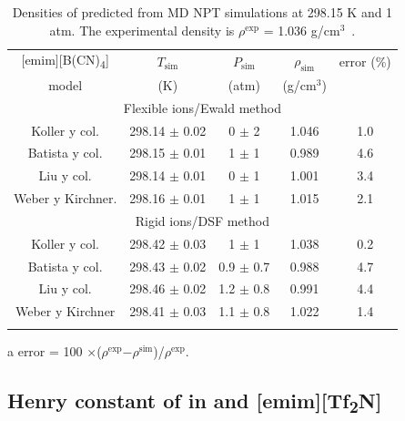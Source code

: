 \documentclass[3p,twocolumn]{elsarticle}
\begin{document}
\begin{table}
\begin{threeparttable}
\caption{Densities of \ce{[emim][B(CN)_4]} predicted from MD NPT simulations at 298.15 K and 1 atm. The experimental density is $\rho^{\text{exp}}$ = 1.036 g/cm$^{3}$~\cite{Doma_ska_2011}.}
\begin{tabular}{ c  c  c  c  c}  
\hline \hline
$\text{[emim]}$[B(CN)\textsubscript{4}] & $T_{\text{sim}}$ & $ P_{\text{sim}} $ & $\rho_{\text{sim}}$ & error (\%)\tnote{a} \\
model & (K) &  (atm) &  (g/cm$^{3}$) &  \\
			\hline
		 \multicolumn{5}{c}{Flexible ions/Ewald method}\\

Koller y col. \cite{Koller_2012}  & 298.14 $\pm$  0.02 & 0 $\pm$ 2 & 1.046 & 1.0 \\
Batista y col. \cite{Batista_2015} & 298.15 $\pm$ 0.01  & 1 $\pm$ 1 & 0.989 & 4.6  \\
Liu y col. \cite{Liu_2014}  & 298.14 $\pm$ 0.01 & 0 $\pm$ 1 & 1.001 & 3.4  \\
Weber y Kirchner. \cite{Weber_2016}  & 298.16  $\pm$ 0.01 & 1 $\pm$ 1 & 1.015 & 2.1  \\
	 \multicolumn{5}{c}{Rigid ions/DSF method}\\
Koller y col. \cite{Koller_2012}   & 298.42  $\pm$ 0.03  & 1 $\pm$ 1 & 1.038 & 0.2 \\
Batista y col. \cite{Batista_2015} & 298.43 $\pm$ 0.02  & 0.9 $\pm$ 0.7  & 0.988 & 4.7  \\
Liu y col. \cite{Liu_2014}  & 298.46 $\pm$ 0.02 & 1.2  $\pm$ 0.8 & 0.991 &  4.4 \\
Weber y Kirchner \cite{Weber_2016} &  298.41 $\pm$ 0.03 & 1.1 $\pm$ 0.8 & 1.022 & 1.4  \\
 \hline \hline
\label{table:props_dsf} 
\end{tabular}
\begin{tablenotes}
\item[a] error = 100 $\times$($\rho^{\text{exp}}$$ - $$\rho^{\text{sim}}$)/$\rho^{\text{exp}}$.
\end{tablenotes}
\end{threeparttable}
\end{table}

\subsection{Henry constant of  in \ce{[emim][B(CN)_4]} and [emim][Tf\textsubscript{2}N]}
\label{sec:henry_results}
\end{document}

